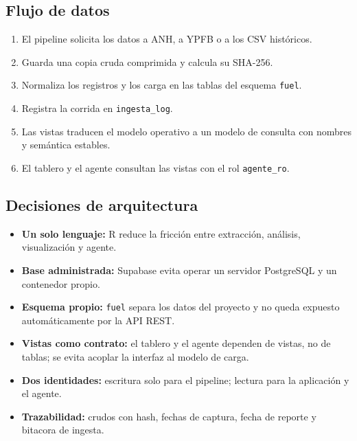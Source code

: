 \documentclass[12pt,a4paper]{article}
\newcommand{\fuel}{\texttt{fuel}}
\newcommand{\vista}[1]{\texttt{#1}}
\begin{document}
\subsection{Flujo de datos}

\begin{enumerate}[leftmargin=1.2cm]
  \item El pipeline solicita los datos a ANH, a YPFB o a los CSV históricos.
  \item Guarda una copia cruda comprimida y calcula su SHA-256.
  \item Normaliza los registros y los carga en las tablas del esquema \fuel{}.
  \item Registra la corrida en \vista{ingesta\_log}.
  \item Las vistas traducen el modelo operativo a un modelo de consulta con nombres y semántica estables.
  \item El tablero y el agente consultan las vistas con el rol \texttt{agente\_ro}.
\end{enumerate}

\subsection{Decisiones de arquitectura}

\begin{itemize}[leftmargin=1.2cm]
  \item \textbf{Un solo lenguaje:} R reduce la fricción entre extracción, análisis, visualización y agente.
  \item \textbf{Base administrada:} Supabase evita operar un servidor PostgreSQL y un contenedor propio.
  \item \textbf{Esquema propio:} \fuel{} separa los datos del proyecto y no queda expuesto automáticamente por la API REST.
  \item \textbf{Vistas como contrato:} el tablero y el agente dependen de vistas, no de tablas; se evita acoplar la interfaz al modelo de carga.
  \item \textbf{Dos identidades:} escritura solo para el pipeline; lectura para la aplicación y el agente.
  \item \textbf{Trazabilidad:} crudos con hash, fechas de captura, fecha de reporte y bitacora de ingesta.
\end{itemize}

\end{document}
